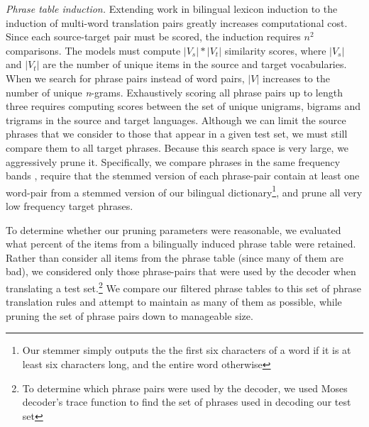 \documentclass[11pt]{article}
\newcommand{\mnote}[1]{\marginpar{%
  \vskip-\baselineskip
  \raggedright\footnotesize
  \itshape\hrule\smallskip\tiny{#1}\par\smallskip\hrule}}
\newcommand{\mtodo}[1]{\mnote{\textcolor{red}{#1}}}
\newcommand{\todo}[1]{\textcolor{red}{TODO: #1}}
\begin{document}
\noindent\emph{Phrase table induction.} Extending work in bilingual lexicon induction to the induction of multi-word translation pairs greatly increases computational cost. Since each source-target pair must be scored, the induction requires $n^2$ comparisons.  The models must  compute $|V_{s}| * |V_{t}|$ similarity scores, where $|V_{s}|$ and $|V_{t}|$ are the number of unique items in the source and target vocabularies. When we search for phrase pairs instead of word pairs, $|V|$ increases to the number of unique {\it n}-grams. Exhaustively scoring all phrase pairs up to length three requires computing scores between the set of unique unigrams, bigrams and trigrams in the source and target languages.  Although we can limit the source phrases that we consider to those that appear in a given test set, we must still compare them to all target phrases.  Because this search space is very large, we aggressively prune it.   Specifically, 
we compare phrases in the same frequency bands \cite{Uszkoreit:2010}, require that the stemmed version of each phrase-pair contain at least one word-pair from a stemmed version of our bilingual dictionary\footnote{Our stemmer simply outputs the the first six characters of a word if it is at least six characters long, and the entire word otherwise}, and prune all very low frequency target phrases. %

To determine whether our pruning parameters were reasonable, we evaluated what percent of the items from a bilingually induced phrase table were retained.  Rather than consider all items from the phrase table (since many of them are bad), we considered only those phrase-pairs that were used by the decoder when translating a test set.\footnote{To determine which phrase pairs were used by the decoder, we used Moses decoder's trace function to find the set of phrases used in decoding our test set} We compare our filtered phrase tables to this set of phrase translation rules and attempt to maintain as many of them as possible, while pruning the set of phrase pairs down to manageable size. \\
\end{document}
